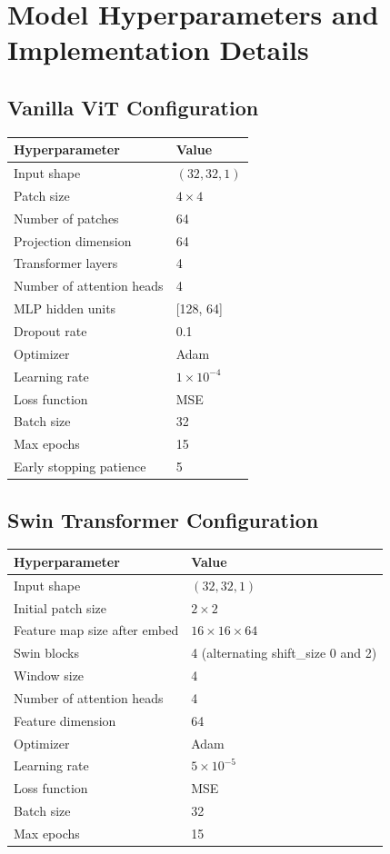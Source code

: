 \documentclass[12pt,a4paper,oneside]{report}
\begin{document}
\appendix
\chapter{Model Hyperparameters and Implementation Details}

\section{Vanilla ViT Configuration}
\begin{tabular}{ll}
\toprule
\textbf{Hyperparameter} & \textbf{Value} \\
\midrule
Input shape & $(32, 32, 1)$ \\
Patch size & $4 \times 4$ \\
Number of patches & 64 \\
Projection dimension & 64 \\
Transformer layers & 4 \\
Number of attention heads & 4 \\
MLP hidden units & [128, 64] \\
Dropout rate & 0.1 \\
Optimizer & Adam \\
Learning rate & $1 \times 10^{-4}$ \\
Loss function & MSE \\
Batch size & 32 \\
Max epochs & 15 \\
Early stopping patience & 5 \\
\bottomrule
\end{tabular}

\section{Swin Transformer Configuration}
\begin{tabular}{ll}
\toprule
\textbf{Hyperparameter} & \textbf{Value} \\
\midrule
Input shape & $(32, 32, 1)$ \\
Initial patch size & $2 \times 2$ \\
Feature map size after embed & $16 \times 16 \times 64$ \\
Swin blocks & 4 (alternating shift\_size 0 and 2) \\
Window size & 4 \\
Number of attention heads & 4 \\
Feature dimension & 64 \\
Optimizer & Adam \\
Learning rate & $5 \times 10^{-5}$ \\
Loss function & MSE \\
Batch size & 32 \\
Max epochs & 15 \\
\bottomrule
\end{tabular}
\end{document}
